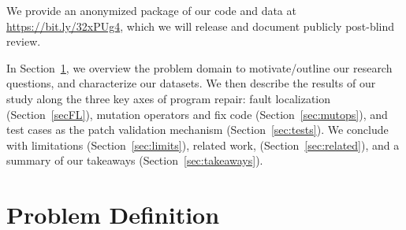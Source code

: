 \documentclass[10pt, conference]{IEEEtran}
\begin{document}
We provide an anonymized package of our code and data at
\url{https://bit.ly/32xPUg4}, which we will release and document publicly
post-blind review.

In Section~\ref{sec:background}, we overview the problem domain to
motivate/outline our research questions, and characterize our datasets.
We then describe the results of our study along the
three key axes of program repair: fault localization (Section~\ref{secFL}),
mutation operators and fix code (Section~\ref{sec:mutops}), and test cases as
the patch validation mechanism (Section~\ref{sec:tests}).  We conclude with
limitations (Section~\ref{sec:limits}), related work,
(Section~\ref{sec:related}), and a summary of
our takeaways (Section~\ref{sec:takeaways}).

\section{Problem Definition}
\label{sec:background}
\end{document}
